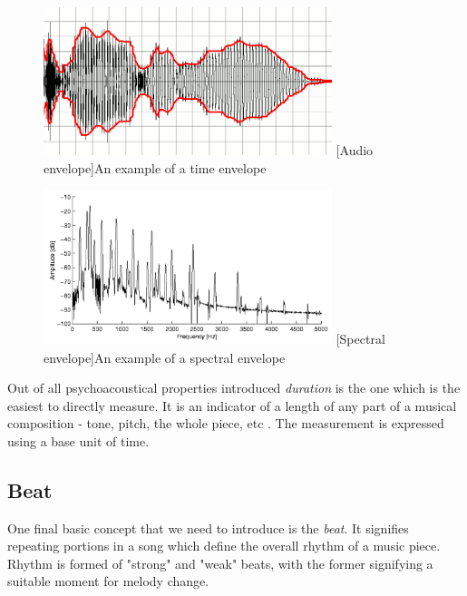 \begin{figure}[H]
    \centering
    \includegraphics[width=0.75\textwidth]{BackgroundTheory/time_envelope.png}
    [Audio envelope]{An example of a time envelope \cite{wiki:timbre}}
    \label{fig:time-envelope}
\end{figure}

\begin{figure}[H]
    \centering
    \includegraphics[width=0.75\textwidth]{BackgroundTheory/spectral_envelope}
    [Spectral envelope]{An example of a spectral envelope \cite{spectralenvelope}}
    \label{fig:spectral-envelope}
\end{figure}

Out of all psychoacoustical properties introduced \textit{duration} is the one
which is the easiest to directly measure. It is an indicator of a length of any
part of a musical composition - tone, pitch, the whole piece, etc
\cite{benward2014music}. The measurement is expressed using a base unit of time.

\subsection{Beat}
\label{subsec:beat}
One final basic concept that we need to introduce is the \textit{beat}. It
signifies repeating portions in a song which define the overall rhythm of a
music piece. Rhythm is formed of "strong" and "weak" beats, with the former
signifying a suitable moment for melody change.

